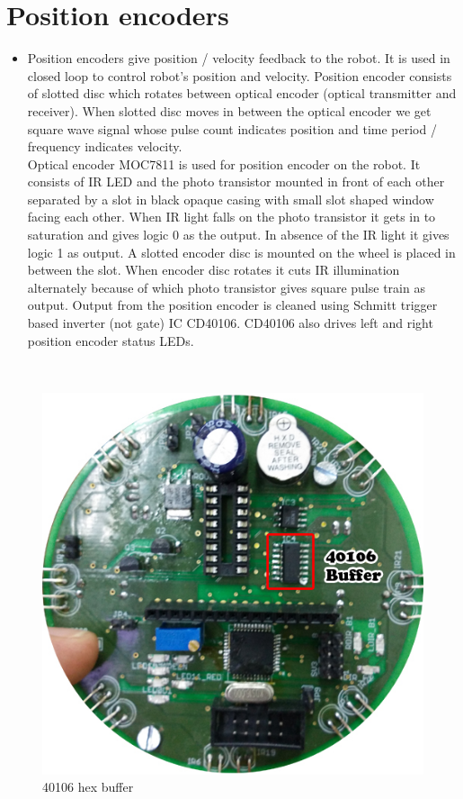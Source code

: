 \documentclass[a4paper,12pt,oneside]{book}
\begin{document}
	\chapter{Position encoders}
	\begin{itemize}
	\item {Position encoders give position / velocity feedback to the robot. It is used in closed loop to
		control robot’s position and velocity. Position encoder consists of slotted disc which rotates
		between optical encoder (optical transmitter and receiver). When slotted disc moves in between
		the optical encoder we get square wave signal whose pulse count indicates position and time
		period / frequency indicates velocity.\\
		Optical encoder MOC7811 is used for position encoder on the robot. It consists of IR LED and
		the photo transistor mounted in front of each other separated by a slot in black opaque casing
		with small slot shaped window facing each other. When IR light falls on the photo transistor it
		gets in to saturation and gives logic 0 as the output. In absence of the IR light it gives logic 1 as
		output. A slotted encoder disc is mounted on the wheel is placed in between the slot. When
		encoder disc rotates it cuts IR illumination alternately because of which photo transistor gives
		square pulse train as output. Output from the position encoder is cleaned using Schmitt trigger
		based inverter (not gate) IC CD40106. CD40106 also drives left and right position encoder status
		LEDs.
	}
	\end{itemize}

	\hfill\\
	\begin{figure}[h!]
		\includegraphics[width=\textwidth]{./HardwareManual/40106_buffer.jpg}
		\caption{40106 hex buffer}
	\end{figure}
\end{document}
